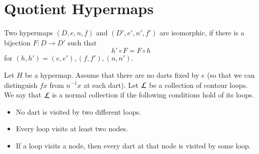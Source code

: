 %
%
%
%
%
%




\section{Quotient Hypermaps}


\begin{definition} Two hypermaps $(D,e,n,f)$ and $(D',e',n',f')$ are
isomorphic, if there is a bijection $F:D\to D'$ such that
    $$h'\circ F = F\circ h$$
for $(h,h')=(e,e'), (f,f'), (n,n')$.
\end{definition}


\begin{definition}
Let $H$ be a hypermap. Assume that 
there are no darts fixed by $e$ 
(so that we can distinguish $f x$
from $n^{-1} x$ at each dart). 
Let $\cal L$ be a collection of contour
loops.  We say that $\cal L$ is a normal collection if the following
conditions hold of its loops. \begin{itemize}
 \item No dart is visited by two different loops.
 \item Every loop visits at least two nodes.
 \item If a loop visits a node, then every dart at that node is
 visited by some loop.
\end{itemize}
\end{definition}

